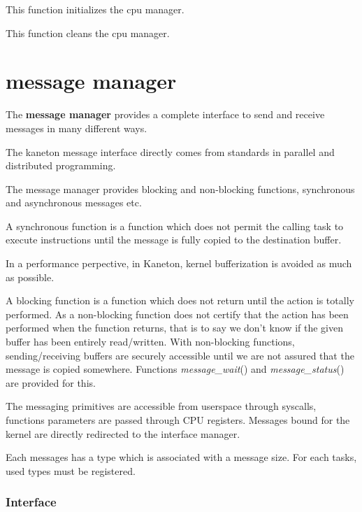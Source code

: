 	 {
	   This function initializes the cpu manager.
	 }

	 {
	   This function cleans the cpu manager.
	 }


%
%

\section{message manager}

The \textbf{message manager} provides a complete interface to send and
receive messages in many different ways.

The kaneton message interface directly comes from standards in parallel
and distributed programming.

The message manager provides blocking and non-blocking functions,
synchronous and asynchronous messages etc.

A synchronous function is a function which does not permit the calling
task to execute instructions until the message is fully copied to the 
destination buffer.

In a performance perpective, in Kaneton, kernel bufferization is avoided
as much as possible.

A blocking function is a function which does not return until the
action is totally performed. As a non-blocking function does not certify
that the action has been performed when the function returns, that is to
say we don't know if the given buffer has been entirely read/written. With
non-blocking functions, sending/receiving buffers are securely accessible
until we are not assured that the message is copied somewhere. Functions
\textit{message\_wait}() and \textit{message\_status}() are provided for
this.

The messaging primitives are accessible from userspace through syscalls,
functions parameters are passed through CPU registers. Messages bound for
the kernel are directly redirected to the interface manager.

Each messages has a type which is associated with a message size. For each
tasks, used types must be registered.

%
%

\subsubsection{Interface}

